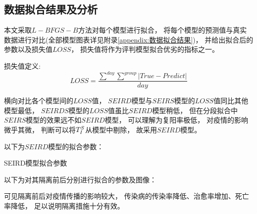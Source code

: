 \subsection{数据拟合结果及分析}
\par 本文采取$L-BFGS-B$方法对每个模型进行拟合，
将每个模型的预测值与真实数据进行对比(全部模型图表详见附录\ref{appendix:数据拟合结果})，
并给出拟合后的参数以及损失值$LOSS$，
损失值将作为评判模型拟合优劣的指标之一。
\par 损失值定义:
\begin{equation}
    LOSS = \frac{\sum\limits^{day}\sum\limits^{group}
        \left|True-Predict\right|}{day}
\end{equation}
\par 横向对比各个模型间的$LOSS$值，
$SEIRD$模型与$SEIRS$模型的$LOSS$值同比其他模型最低，
$SEIRDS$模型的$LOSS$值虽比$SEIRD$模型稍低，
但在分段拟合中$SEIRS$模型的效果远不如$SEIRD$模型，
可以理解为复阳率极低，
对疫情的影响微乎其微，
判断可以将$T^{S}_{I}$从模型中剔除，
故采用$SEIRD$模型。
\par 以下为$SEIRD$模型的拟合参数：
\begin{table}[H]
    \centering
    \caption{SEIRD模型拟合参数}
    
\end{table}
\par 以下为对其隔离前后分别进行拟合的参数及图像：
\\
\par 可见隔离前后对疫情传播的影响较大，
传染病的传染率降低、治愈率增加、死亡率降低，
足以说明隔离措施十分有效。